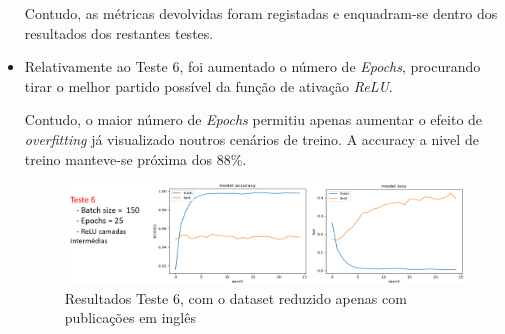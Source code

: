 \begin{itemize}
    Contudo, as métricas devolvidas foram registadas e enquadram-se dentro dos resultados dos restantes testes. 
    
   \item Relativamente ao Teste 6, foi aumentado o número de \textit{Epochs}, procurando tirar o melhor partido possível da função de ativação \textit{ReLU}. 
   
   Contudo, o maior número de \textit{Epochs} permitiu apenas aumentar o efeito de \textit{overfitting} já visualizado noutros cenários de treino. A accuracy a nivel de treino manteve-se próxima dos 88\%.
   
   \begin{figure}[H]
        \hspace{-0.4in}
        \includegraphics[scale=0.65]{Imagens/t2.png}
        \caption{Resultados Teste 6, com o  dataset reduzido apenas com publicações em inglês}
        \label{fig:teste3}
    \end{figure}
   
\end{itemize}